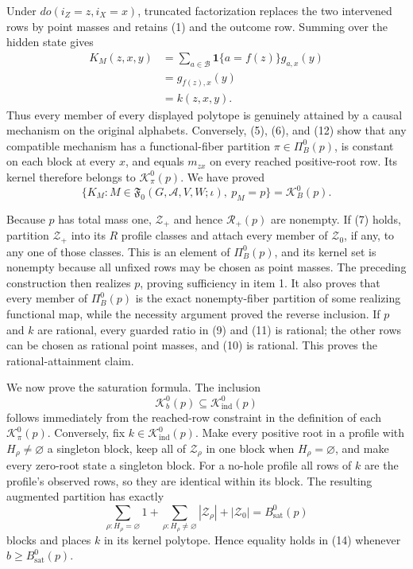 Under \(do(i_Z=z,i_X=x)\), truncated factorization replaces the two
intervened rows by point masses and retains (1) and the outcome row.
Summing over the hidden state gives
\[
\begin{aligned}
 K_M(z,x,y)
 &=\sum_{a\in\mathcal B}
   \mathbf 1\{a=f(z)\}g_{a,x}(y)\\
 &=g_{f(z),x}(y)\\
 &=k(z,x,y).
\end{aligned}
\tag{12}
\]
Thus every member of every displayed polytope is genuinely attained by a
causal mechanism on the original alphabets.  Conversely, (5), (6), and
(12) show that any compatible mechanism has a functional-fiber partition
\(\pi\in\Pi_B^0(p)\), is constant on each block at every \(x\), and
equals \(m_{zx}\) on every reached positive-root row.  Its kernel
therefore belongs to \(\mathcal K_\pi^0(p)\).  We have proved
\[
 \{K_M:M\in\mathfrak F_0(G,\mathcal A,V,W;\iota),\ p_M=p\}
 =\mathcal K_B^0(p).
\tag{13}
\]

Because \(p\) has total mass one, \(\mathcal Z_+\) and hence
\(\mathcal R_+(p)\) are nonempty.  If (7) holds, partition
\(\mathcal Z_+\) into its \(R\) profile classes and attach every member
of \(\mathcal Z_0\), if any, to any one of those classes.  This is an
element of \(\Pi_B^0(p)\), and its kernel set is nonempty because all
unfixed rows may be chosen as point masses.  The preceding construction
then realizes \(p\), proving sufficiency in item 1.  It also proves that
every member of \(\Pi_B^0(p)\) is the exact nonempty-fiber partition of
some realizing functional map, while the necessity argument proved the
reverse inclusion.  If \(p\) and \(k\) are rational, every guarded ratio
in (9) and (11) is rational; the other rows can be chosen as rational
point masses, and (10) is rational.  This proves the rational-attainment
claim.

We now prove the saturation formula.  The inclusion
\[
 \mathcal K_b^0(p)\subseteq\mathcal K_{\mathrm{ind}}^0(p)
\tag{14}
\]
follows immediately from the reached-row constraint in the definition of
each \(\mathcal K_\pi^0(p)\).  Conversely, fix
\(k\in\mathcal K_{\mathrm{ind}}^0(p)\).  Make every positive root in a
profile with \(H_\rho\ne\varnothing\) a singleton block, keep all of
\(\mathcal Z_\rho\) in one block when \(H_\rho=\varnothing\), and make
every zero-root state a singleton block.  For a no-hole profile all rows
of \(k\) are the profile's observed rows, so they are identical within
its block.  The resulting augmented partition has exactly
\[
 \sum_{\rho:H_\rho=\varnothing}1
 +\sum_{\rho:H_\rho\ne\varnothing}|\mathcal Z_\rho|
 +|\mathcal Z_0|
 =B_{\mathrm{sat}}^0(p)
\tag{15}
\]
blocks and places \(k\) in its kernel polytope.  Hence equality holds in
(14) whenever \(b\geq B_{\mathrm{sat}}^0(p)\).

